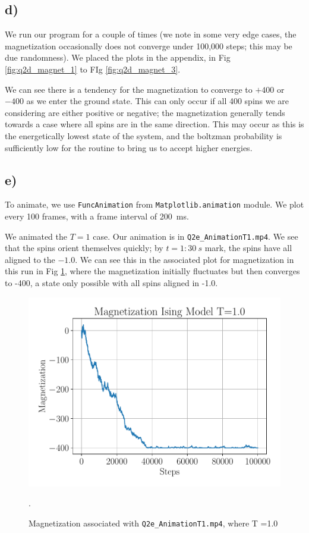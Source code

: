 \documentclass{article}
\begin{document}
\subsection*{d)}
We run our program for a couple of times (we note in some very edge cases, the magnetization occasionally does not converge under 100,000 steps; this may be due randomness). We placed the plots in the appendix, in Fig \ref{fig:q2d_magnet_1} to FIg \ref{fig:q2d_magnet_3}.


We can see there is a tendency for the magnetization to converge to $+400$ or $-400$ as we enter the ground state. This can only occur if all 400 spins we are considering are either positive or negative; the magnetization generally tends towards a case where all spins are in the same direction. This may occur as this is the energetically lowest state of the system, and the boltzman probability is sufficiently low for the routine to bring us to accept higher energies.


\subsection*{e)}
To animate, we use \texttt{FuncAnimation} from \texttt{Matplotlib.animation} module. We plot every 100 frames, with a frame interval of \SI{200}{ms}. 

We animated the $T=1$ case. Our animation is in \texttt{Q2e\_AnimationT1.mp4}. We see that the spins orient themselves quickly; by $t = 1:30 \SI{}{s}$ mark, the spins have all aligned to the $-1.0$. We can see this in the associated plot for magnetization in this run in Fig \ref{fig:q2e_magnet_1}, where the magnetization initially fluctuates but then converges to -400, a state only possible with all spins aligned in -1.0. 
\begin{figure}[h!]
    \centerline{\includegraphics[scale=0.6]{images/Q2e_magnetizationT_1.0.pdf}}
    \caption{Magnetization associated with \texttt{Q2e\_AnimationT1.mp4}, where T =1.0}.
    \label{fig:q2e_magnet_1}
\end{figure}
\end{document}
